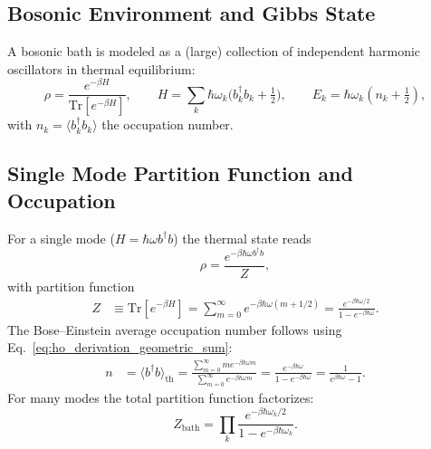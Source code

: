 \subsection{Bosonic Environment and Gibbs State}
\label{subsec:bosonic_environment_gibbs}
A bosonic bath is modeled as a (large) collection of independent harmonic oscillators in thermal equilibrium:
\begin{equation} \label{eq:ho_gibbs_state}
	\rho = \frac{e^{-\beta H}}{\mathrm{Tr}[e^{-\beta H}]}, \qquad H=\sum_k \hbar \omega_k \Big(b_k^{\dagger} b_k + \tfrac{1}{2}\Big), \qquad E_k = \hbar \omega_k (n_k + \tfrac{1}{2}),
\end{equation}
with $n_k = \langle b_k^{\dagger} b_k \rangle$ the occupation number.

\subsection{Single Mode Partition Function and Occupation}
\label{subsec:single_mode}
For a single mode ($H=\hbar \omega b^{\dagger} b$) the thermal state reads
\begin{equation} \label{eq:ho_single_mode_density_matrix}
	\rho = \frac{e^{-\beta \hbar \omega b^{\dagger} b}}{Z},
\end{equation}
with partition function
\begin{align} \label{eq:ho_partition_function}
	Z & \equiv \mathrm{Tr}[e^{-\beta H}] = \sum_{m=0}^{\infty} e^{-\beta \hbar \omega (m+1/2)} = \frac{e^{-\beta \hbar \omega/2}}{1 - e^{-\beta \hbar \omega}}.
\end{align}
The Bose--Einstein average occupation number follows using Eq.~\eqref{eq:ho_derivation_geometric_sum}:
\begin{align} \label{eq:ho_expectation_number_operator}
	n & = \langle b^{\dagger} b \rangle_{\text{th}} = \frac{\sum_{m=0}^{\infty} m e^{-\beta \hbar \omega m}}{\sum_{m=0}^{\infty} e^{-\beta \hbar \omega m}} = \frac{e^{-\beta \hbar \omega}}{1-e^{-\beta \hbar \omega}} = \frac{1}{e^{\beta \hbar \omega}-1}.
\end{align}
For many modes the total partition function factorizes:
\begin{equation} \label{eq:ho_generalized_partition_function}
	Z_{\text{bath}} = \prod_k \frac{e^{-\beta \hbar \omega_k /2}}{1 - e^{-\beta \hbar \omega_k}}.
\end{equation}

